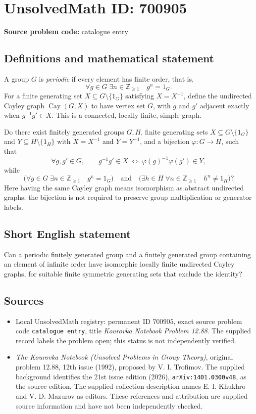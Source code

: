 \documentclass[11pt]{article}
\newcommand{\Z}{\mathbb{Z}}
\begin{document}
\section*{UnsolvedMath ID: 700905}
\textbf{Source problem code:} catalogue entry
\subsection{Definitions and mathematical statement}
A group \(G\) is \emph{periodic} if every element has finite order, that is,
\[
\forall g\in G\;\exists n\in\Z_{\geq 1}\quad g^n=1_G.
\]
For a finite generating set \(X\subseteq G\setminus\{1_G\}\) satisfying \(X=X^{-1}\), define the undirected Cayley graph \(\operatorname{Cay}(G,X)\) to have vertex set \(G\), with \(g\) and \(g'\) adjacent exactly when \(g^{-1}g'\in X\). This is a connected, locally finite, simple graph.

Do there exist finitely generated groups \(G,H\), finite generating sets \(X\subseteq G\setminus\{1_G\}\) and \(Y\subseteq H\setminus\{1_H\}\) with \(X=X^{-1}\) and \(Y=Y^{-1}\), and a bijection \(\varphi:G\to H\), such that
\[
\forall g,g'\in G,\qquad
 g^{-1}g'\in X\ \Longleftrightarrow\ \varphi(g)^{-1}\varphi(g')\in Y,
\]
while
\[
\bigl(\forall g\in G\;\exists n\in\Z_{\geq1}\quad g^n=1_G\bigr)
\quad\text{and}\quad
\bigl(\exists h\in H\;\forall n\in\Z_{\geq1}\quad h^n\ne1_H\bigr)?
\]
Here having the same Cayley graph means isomorphism as abstract undirected graphs; the bijection is not required to preserve group multiplication or generator labels.
\subsection{Short English statement}
Can a periodic finitely generated group and a finitely generated group containing an element of infinite order have isomorphic locally finite undirected Cayley graphs, for suitable finite symmetric generating sets that exclude the identity?
\subsection{Sources}
\begin{itemize}
\item Local UnsolvedMath registry: permanent ID \(700905\), exact source problem code \texttt{catalogue entry}, title \emph{Kourovka Notebook Problem 12.88}. The supplied record labels the problem open; this status is not independently verified.
\item \emph{The Kourovka Notebook (Unsolved Problems in Group Theory)}, original problem 12.88, 12th issue (1992), proposed by V. I. Trofimov. The supplied background identifies the 21st issue edition (2026), \texttt{arXiv:1401.0300v48}, as the source edition. The supplied collection description names E. I. Khukhro and V. D. Mazurov as editors. These references and attribution are supplied source information and have not been independently checked.
\end{itemize}
\end{document}
